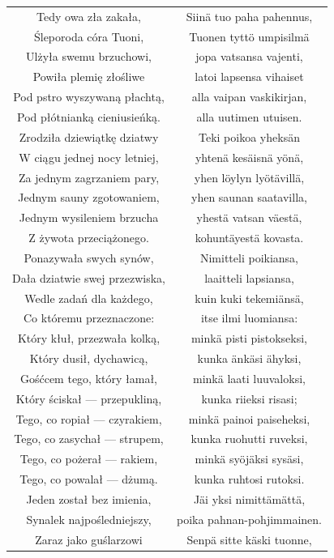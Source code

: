 \documentclass[11pt,a4paper,twoside]{report}
\begin{document}
{\centering
\small
\begin{longtable}{c c}
Tedy owa zła zakała, & Siinä tuo paha pahennus, \\
Śleporoda córa Tuoni, & Tuonen tyttö umpisilmä \\
Ulżyła swemu brzuchowi, & jopa vatsansa vajenti, \\
Powiła plemię złośliwe & latoi lapsensa vihaiset \\
Pod pstro wyszywaną płachtą, & alla vaipan vaskikirjan, \\
Pod płótnianką cieniusieńką. & alla uutimen utuisen. \\
Zrodziła dziewiątkę dziatwy & Teki poikoa yheksän \\
W ciągu jednej nocy letniej, & yhtenä kesäisnä yönä, \\
Za jednym zagrzaniem pary, & yhen löylyn lyötävillä, \\
Jednym sauny zgotowaniem, & yhen saunan saatavilla, \\
Jednym wysileniem brzucha & yhestä vatsan väestä, \\
Z żywota przeciążonego. & kohuntäyestä kovasta. \\
Ponazywała swych synów, & Nimitteli poikiansa, \\
Dała dziatwie swej przezwiska, & laaitteli lapsiansa, \\
Wedle zadań dla każdego, & kuin kuki tekemiänsä, \\
Co któremu przeznaczone: & itse ilmi luomiansa: \\
Który kłuł, przezwała kolką, & minkä pisti pistokseksi, \\
Który dusił, dychawicą, & kunka änkäsi ähyksi, \\
Gośćcem tego, który łamał, & minkä laati luuvaloksi, \\
Który ściskał --- przepukliną, & kunka riieksi risasi; \\
Tego, co ropiał --- czyrakiem, & minkä painoi paiseheksi, \\
Tego, co zasychał --- strupem, & kunka ruohutti ruveksi, \\
Tego, co pożerał --- rakiem, & minkä syöjäksi sysäsi, \\
Tego, co powalał --- dżumą. & kunka ruhtosi rutoksi. \\
Jeden został bez imienia, & Jäi yksi nimittämättä, \\
Synalek najpośledniejszy, & poika pahnan-pohjimmainen. \\
Zaraz jako guślarzowi & Senpä sitte käski tuonne, \\

\end{longtable}}
\end{document}
